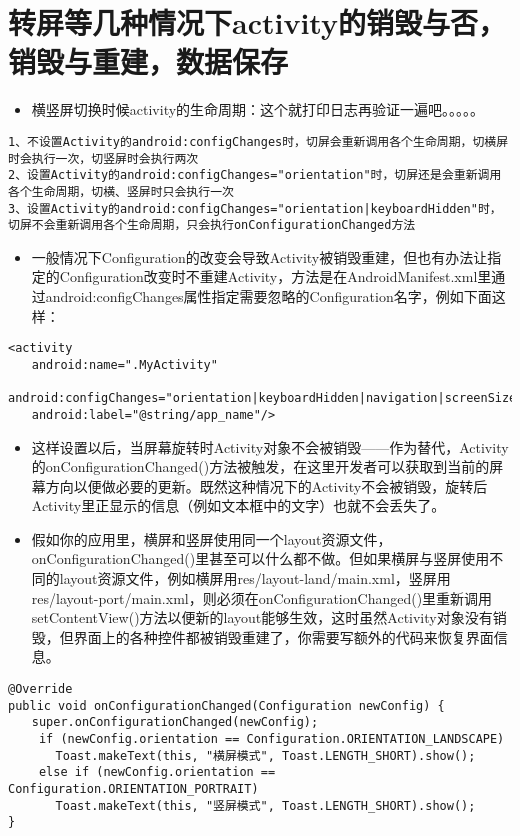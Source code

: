 \documentclass[9pt, b5paper]{article}
\begin{document}
\section{转屏等几种情况下activity的销毁与否，销毁与重建，数据保存}
\label{sec-14}
\begin{itemize}
\item 横竖屏切换时候activity的生命周期：这个就打印日志再验证一遍吧。。。。。
\end{itemize}
\begin{verbatim}
1、不设置Activity的android:configChanges时，切屏会重新调用各个生命周期，切横屏时会执行一次，切竖屏时会执行两次 
2、设置Activity的android:configChanges="orientation"时，切屏还是会重新调用各个生命周期，切横、竖屏时只会执行一次 
3、设置Activity的android:configChanges="orientation|keyboardHidden"时，切屏不会重新调用各个生命周期，只会执行onConfigurationChanged方法
\end{verbatim}
\begin{itemize}
\item 一般情况下Configuration的改变会导致Activity被销毁重建，但也有办法让指定的Configuration改变时不重建Activity，方法是在AndroidManifest.xml里通过android:configChanges属性指定需要忽略的Configuration名字，例如下面这样：
\end{itemize}
\begin{verbatim}
<activity 
　　android:name=".MyActivity" 
    android:configChanges="orientation|keyboardHidden|navigation|screenSize"
　　android:label="@string/app_name"/>
\end{verbatim}
\begin{itemize}
\item 这样设置以后，当屏幕旋转时Activity对象不会被销毁——作为替代，Activity的onConfigurationChanged()方法被触发，在这里开发者可以获取到当前的屏幕方向以便做必要的更新。既然这种情况下的Activity不会被销毁，旋转后Activity里正显示的信息（例如文本框中的文字）也就不会丢失了。
\item 假如你的应用里，横屏和竖屏使用同一个layout资源文件，onConfigurationChanged()里甚至可以什么都不做。但如果横屏与竖屏使用不同的layout资源文件，例如横屏用res/layout-land/main.xml，竖屏用res/layout-port/main.xml，则必须在onConfigurationChanged()里重新调用setContentView()方法以便新的layout能够生效，这时虽然Activity对象没有销毁，但界面上的各种控件都被销毁重建了，你需要写额外的代码来恢复界面信息。
\end{itemize}
\begin{verbatim}
@Override 
public void onConfigurationChanged(Configuration newConfig) { 
　　super.onConfigurationChanged(newConfig); 
 　　if (newConfig.orientation == Configuration.ORIENTATION_LANDSCAPE) 
　　　　Toast.makeText(this, "横屏模式", Toast.LENGTH_SHORT).show(); 
 　　else if (newConfig.orientation == Configuration.ORIENTATION_PORTRAIT)
　　　　Toast.makeText(this, "竖屏模式", Toast.LENGTH_SHORT).show(); 
}
\end{verbatim}
\end{document}
